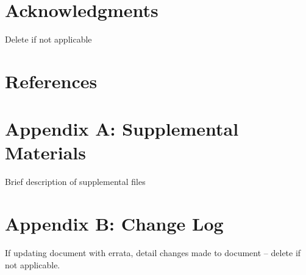 \documentclass[12pt]{article}
\begin{document}
\section*{Acknowledgments}
\noindent Delete if not applicable\\

\section*{References}

\nocite{*}



\section*{Appendix A: Supplemental Materials}
Brief description of supplemental files\\

\section*{Appendix B: Change Log}
If updating document with errata, detail changes made to document – delete if not applicable. \\
\end{document}
